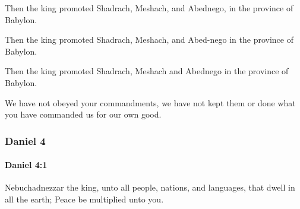 			Then the king promoted Shadrach, Meshach, and Abednego, in the province of Babylon.

			\begin{versebox}
					\item[BHS] 
					\item[LXX] 
					\item[ASV] Then the king promoted Shadrach, Meshach, and Abed-nego in the province of Babylon.
					\item[NIV] Then the king promoted Shadrach, Meshach and Abednego in the province of Babylon.
					\item[NRSV] We have not obeyed your commandments, we have not kept them or done what you have commanded us for our own good.
			\end{versebox}
	\subsubsection{Daniel 4} %
		\label{DANIEL-4}

		\paragraph{Daniel 4:1} %
			\label{DANIEL-4-1}

			Nebuchadnezzar the king, unto all people, nations, and languages, that dwell in all the earth; Peace be multiplied unto you.


